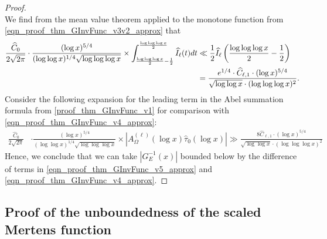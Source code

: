 \documentclass[11pt,reqno,a4letter]{article}
\numberwithin{figure}{section}
\numberwithin{table}{section}
\theoremstyle{plain}
\numberwithin{theorem}{section}
\theoremstyle{definition}
\begin{document}
\begin{proof}
\begin{equation}
\end{equation} 
We find from the mean value theorem applied to the monotone function from 
\eqref{eqn_proof_thm_GInvFunc_v3v2_approx} that 
\begin{align} 
\label{eqn_proof_thm_GInvFunc_v4_approx} 
\frac{\widehat{C}_0}{2 \sqrt{2\pi}} \cdot 
     \frac{(\log x)^{5/4}}{(\log\log x)^{1/4} \sqrt{\log\log\log x}} \times 
     \int_{\frac{\log\log\log x}{2}-\frac{1}{2}}^{\frac{\log\log\log x}{2}} 
     \widehat{I}_{\ell}(t) dt & \ll 
     \frac{1}{2} \widehat{I}_{\ell}\left(\frac{\log\log\log x}{2}-\frac{1}{2}\right) \\ 
\notag 
     & = \frac{e^{1/4} \cdot \widehat{C}_{\ell,1} \cdot (\log x)^{5/4}}{ 
     \sqrt{\log\log x} \cdot (\log\log\log x)^2}. 
\end{align} 
Consider the following expansion for the leading term in 
the Abel summation formula from \eqref{proof_thm_GInvFunc_v1} for comparison with 
\eqref{eqn_proof_thm_GInvFunc_v4_approx}: 
\begin{align} 
\label{eqn_proof_thm_GInvFunc_v5_approx} 
\frac{\widehat{C}_0}{2 \sqrt{2\pi}} & \cdot 
     \frac{(\log x)^{5/4}}{(\log\log x)^{1/4} \sqrt{\log\log\log x}} \times 
     \left\lvert A_{\Omega}^{(\ell)}(\log x) \widehat{\tau}_0(\log x) \right\rvert 
     \gg 
     \frac{8 \widehat{C}_{\ell,1} \cdot (\log x)^{5/4}}{ 
     \sqrt{\log\log x} \cdot (\log\log\log x)^2}
\end{align} 
Hence, we conclude that we can take $\left\lvert G_{E}^{-1}\left(x\right) \right\rvert$ 
bounded below by the difference of terms in 
\eqref{eqn_proof_thm_GInvFunc_v5_approx} and 
\eqref{eqn_proof_thm_GInvFunc_v4_approx}. 
\end{proof} 

\subsection{Proof of the unboundedness of the scaled Mertens function}
\label{subSection_TheCoreResultProof} 
\end{document}
